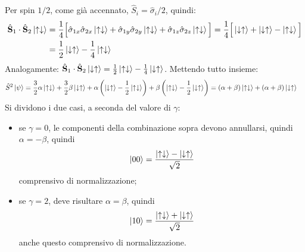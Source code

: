 \documentclass[11pt, a4paper]{scrartcl} %
\numberwithin{equation}{subsection}
\theoremstyle{style2}
\theoremstyle{style1}
\begin{document}
\begin{enumerate}[(1).]
Per spin $ 1 / 2$, come gi\`a accennato, $\hat{S}_i = \hat{\sigma }_i / 2$, quindi:
\[
\begin{split}
	\hat{\mathbf{S} }_1 \cdot \hat{\mathbf{S} }_2 \ket{\uparrow\downarrow} &= \frac{1}{4}\Big[\hat{\sigma }_{1x} \hat{\sigma }_{2x} \ket{\uparrow\downarrow} + \hat{\sigma }_{1y} \hat{\sigma }_{2y} \ket{\uparrow\downarrow} + \hat{\sigma }_{1z} \hat{\sigma }_{2z} \ket{\uparrow \downarrow} \Big] = \frac{1}{4} \Big[\ket{\downarrow\uparrow} + \ket{\downarrow\uparrow} - \ket{\uparrow\downarrow} \Big]\\
									       &= \frac{1}{2}\ket{\downarrow\uparrow} - \frac{1}{4} \ket{\uparrow\downarrow} 
\end{split}
\] 
Analogamente: $\hat{\mathbf{S} }_1 \cdot \hat{\mathbf{S} }_2 \ket{\downarrow\uparrow}  = \frac{1}{2}\ket{\uparrow\downarrow} -\frac{1}{4}\ket{\downarrow\uparrow}  $.
Mettendo tutto insieme:
\[
\begin{split}
	\hat{S}^2 \ket{\psi } &= \frac{3}{2}\alpha  \ket{\uparrow\downarrow} + \frac{3}{2} \beta \ket{\downarrow\uparrow} +\alpha  \left(\ket{\downarrow\uparrow} -\frac{1}{2}\ket{\uparrow\downarrow} \right) + \beta \left(\ket{\uparrow\downarrow} -\frac{1}{2}\ket{\downarrow\uparrow} \right) = (\alpha +\beta ) \ket{\uparrow\downarrow} + (\alpha +\beta ) \ket{\downarrow\uparrow} 
\end{split}
\] 
Si dividono i due casi, a seconda del valore di $\gamma$:
\begin{itemize}
	\item se $\gamma=0$, le componenti della combinazione sopra devono annullarsi, quindi $\alpha  = - \beta $, quindi
		\begin{equation}
			\ket{00} = \frac{\ket{\uparrow\downarrow} - \ket{\downarrow\uparrow} }{\sqrt{2} }
		\end{equation}
		comprensivo di normalizzazione;
	\item se $\gamma=2$, deve risultare $\alpha = \beta $, quindi
		\begin{equation}
			\ket{10}  = \frac{\ket{\uparrow \downarrow} + \ket{\downarrow\uparrow} }{\sqrt{2} }
		\end{equation}
		anche questo comprensivo di normalizzazione.
\end{itemize}
\end{enumerate}
\end{document}

